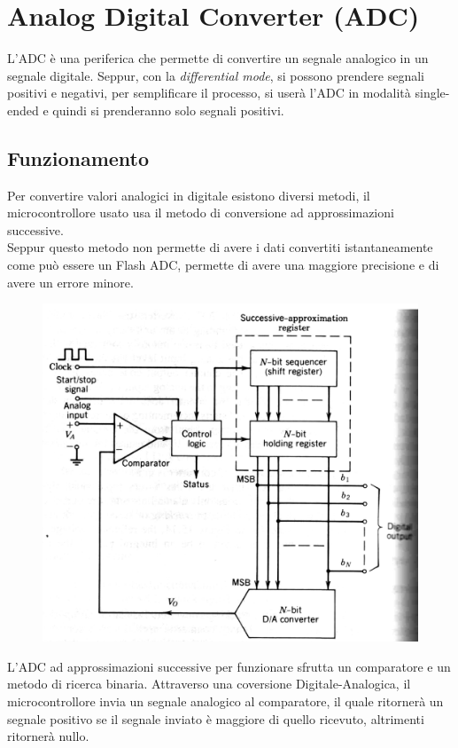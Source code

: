 
\section{Analog Digital Converter (ADC)}
L'ADC è una periferica che permette di convertire un segnale analogico in un segnale digitale. Seppur, con la \textit{differential mode}, si possono prendere segnali positivi e negativi, per semplificare il processo, si userà l'ADC in modalità single-ended e quindi si prenderanno solo segnali positivi.\\

\subsection{Funzionamento}
Per convertire valori analogici in digitale esistono diversi metodi, il microcontrollore usato usa il metodo di conversione ad approssimazioni successive.\\

Seppur questo metodo non permette di avere i dati convertiti istantaneamente come può essere un Flash ADC, permette di avere una maggiore precisione e di avere un errore minore.\\

\begin{figure}
    \includegraphics[width=0.8\linewidth]{microcontrollore/assets/ADC.png}
    \label{fig:ADC}
\end{figure}

L'ADC ad approssimazioni successive per funzionare sfrutta un comparatore e un metodo di ricerca binaria. Attraverso una coversione Digitale-Analogica, il microcontrollore invia un segnale analogico al comparatore, il quale ritornerà un segnale positivo se il segnale inviato è maggiore di quello ricevuto, altrimenti ritornerà nullo.\\

